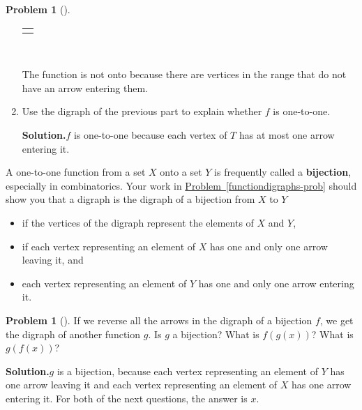 \documentclass[10pt,]{book}
\newcommand{\terminology}[1]{\textbf{#1}}
\theoremstyle{plain}
\theoremstyle{definition}
\newtheorem{activity}[project]{Problem}
\theoremstyle{definition}
\numberwithin{equation}{chapter}
\newlength{\panelmax}
\begin{document}
\begin{activity}[]
\begin{enumerate}[font=\bfseries,label=(\alph*),ref=\alph*]
{{{{
}
}}
\newlength{\phAYimage}\setlength{\phAYimage}{\ht\panelboxAYimage+\dp\panelboxAYimage}
\settototalheight{\phAYimage}{\usebox{\panelboxAYimage}}
\setlength{\panelmax}{\maxof{\panelmax}{\phAYimage}}
\leavevmode%
\setlength{\tabcolsep}{0\linewidth}
\par\medskip\noindent
\hspace*{0.25\linewidth}%
\begin{tabular}{@{}*{1}{c}@{}}
\begin{minipage}[c][\panelmax][t]{0.5\linewidth}\usebox{\panelboxAYimage}\end{minipage}\end{tabular}\\
}%
\par
The function is not onto because there are vertices in the range that do not have an arrow entering them.%
\item\label{task-249} Use the digraph of the previous part to explain whether \(f\) is one-to-one.%
\par\medskip\noindent%
\textbf{Solution.}\quad \(f\) is one-to-one because each vertex of \(T\) has at most one arrow entering it.%
\end{enumerate}
\end{activity}
A one-to-one function from a set \(X\) onto a set \(Y\) is frequently called a \terminology{bijection}, especially in combinatorics.  Your work in \hyperref[functiondigraphs-prob]{Problem~\ref{functiondigraphs-prob}} should show you that a digraph is the digraph of a bijection from \(X\) to \(Y\) \leavevmode%
\begin{itemize}[label=\textbullet]
\item{}if the vertices of the digraph represent the elements of \(X\) and \(Y\),%
\item{}if each vertex representing an element of \(X\) has one and only one arrow leaving it, and%
\item{}each vertex representing an element of \(Y\) has one and only one arrow entering it.%
\end{itemize}
%
\begin{activity}[]\label{activity-338}
If we reverse all the arrows in the digraph of a bijection \(f\), we get the digraph of another function \(g\). Is \(g\) a bijection? What is \(f(g(x))\)? What is \(g(f(x))\)?%
\par\medskip\noindent%
\textbf{Solution.}\quad \(g\) is a bijection, because each vertex representing an element of \(Y\) has one arrow leaving it and each vertex representing an element of \(X\) has one arrow entering it.  For both of the next questions, the answer is \(x\).%
\end{activity}
\end{document}
